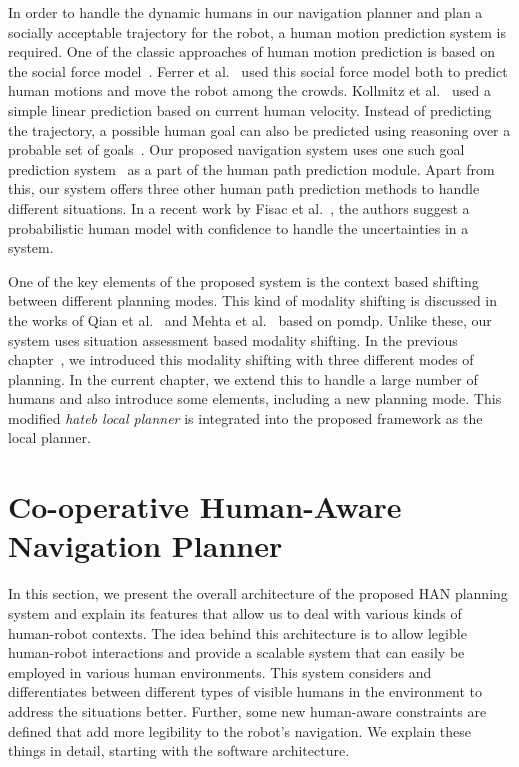 In order to handle the dynamic humans in our navigation planner and plan a socially acceptable trajectory for the robot, a human motion prediction system is required. One of the classic approaches of human motion prediction is based on the social force model~\cite{helbing1995social}. Ferrer et al.~\cite{ferrer2015multi} used this social force model both to predict human motions and move the robot among the crowds. Kollmitz et al.~\cite{kollmitz2015time} used a simple linear prediction based on current human velocity. Instead of predicting the trajectory, a possible human goal can also be predicted using reasoning over a probable set of goals~\cite{bordallo_iros_2015}. Our proposed navigation system uses one such goal prediction system~\cite{ferrer2014bayesian} as a part of the human path prediction module. Apart from this, our system offers three other human path prediction methods to handle different situations. In a recent work by Fisac et al.~\cite{fisac2018probabilistically}, the authors suggest a probabilistic human model with confidence to handle the uncertainties in a system.

One of the key elements of the proposed system is the context based shifting between different planning modes. This kind of modality shifting is discussed in the works of Qian et al.~\cite{qian2013decision} and Mehta et al.~\cite{mehta2016autonomous} based on \acrfull{pomdp}. Unlike these, our system uses situation assessment based modality shifting. In the previous chapter~\cite{singamaneni2020hateb}, we introduced this modality shifting with three different modes of planning. In the current chapter, we extend this to handle a large number of humans and also introduce some elements, including a new planning mode. This modified \textit{\acrshort{hateb} local planner} is integrated into the proposed framework as the local planner.

\section{Co-operative Human-Aware Navigation Planner}
\label{cohan_sec}
In this section, we present the overall architecture of the proposed HAN planning system and explain its features that allow us to deal with various kinds of human-robot contexts. The idea behind this architecture is to allow legible human-robot interactions and provide a scalable system that can easily be employed in various human environments. This system considers and differentiates between different types of visible humans in the environment to address the situations better. Further, some new human-aware constraints are defined that add more legibility to the robot's navigation. We explain these things in detail, starting with the software architecture. 

